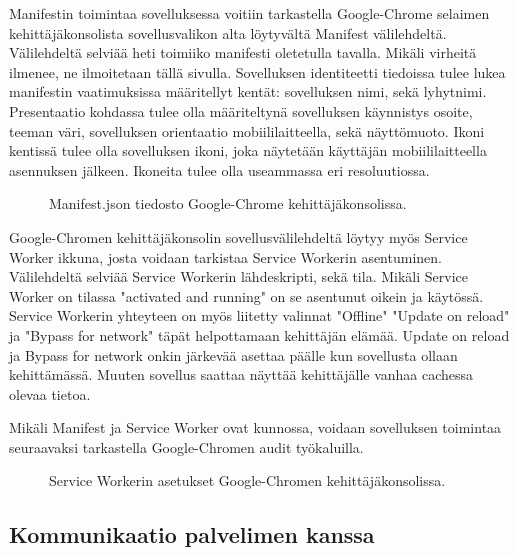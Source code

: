 \documentclass{tktltiki}
\begin{document}
Manifestin toimintaa sovelluksessa voitiin tarkastella Google-Chrome selaimen kehittäjäkonsolista sovellusvalikon alta löytyvältä Manifest välilehdeltä. Välilehdeltä selviää heti toimiiko manifesti oletetulla tavalla. Mikäli virheitä ilmenee, ne ilmoitetaan tällä sivulla. Sovelluksen identiteetti tiedoissa tulee lukea manifestin vaatimuksissa määritellyt kentät: sovelluksen nimi, sekä lyhytnimi. Presentaatio kohdassa tulee olla määriteltynä sovelluksen käynnistys osoite, teeman väri, sovelluksen orientaatio mobiililaitteella, sekä näyttömuoto. Ikoni kentissä tulee olla sovelluksen ikoni, joka näytetään käyttäjän mobiililaitteella asennuksen jälkeen. Ikoneita tulee olla useammassa eri resoluutiossa. 

\begin{figure}[h]
\begin{center}
\caption{Manifest.json tiedosto Google-Chrome kehittäjäkonsolissa.}
\label{Manifest.json}
\end{center}
\end{figure}
\clearpage

Google-Chromen kehittäjäkonsolin sovellusvälilehdeltä löytyy myös Service Worker ikkuna, josta voidaan tarkistaa Service Workerin asentuminen. Välilehdeltä selviää Service Workerin lähdeskripti, sekä tila. Mikäli Service Worker on tilassa "activated and running" on se asentunut oikein ja käytössä. Service Workerin yhteyteen on myös liitetty valinnat "Offline" "Update on reload" ja "Bypass for network" täpät helpottamaan kehittäjän elämää. Update on reload ja Bypass for network onkin järkevää asettaa päälle kun sovellusta ollaan kehittämässä. Muuten sovellus saattaa näyttää kehittäjälle vanhaa cachessa olevaa tietoa. 

Mikäli Manifest ja Service Worker ovat kunnossa, voidaan sovelluksen toimintaa seuraavaksi tarkastella Google-Chromen audit työkaluilla.

\begin{figure}[h]
\begin{center}
\caption{Service Workerin asetukset Google-Chromen kehittäjäkonsolissa.}
\label{Service Worker}
\end{center}
\end{figure}

\subsection{Kommunikaatio palvelimen kanssa}
\end{document}
